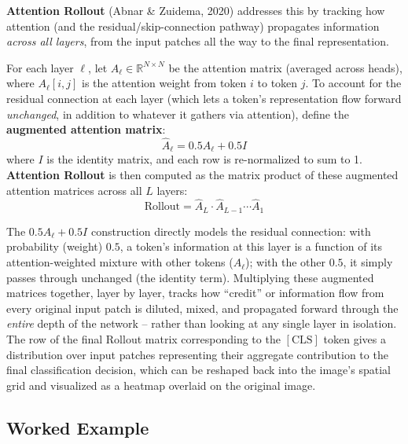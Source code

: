 \documentclass[12pt,a4paper]{article}
\begin{document}
\textbf{Attention Rollout} (Abnar \& Zuidema, 2020) addresses this by tracking how attention (and the residual/skip-connection pathway) propagates information \emph{across all layers}, from the input patches all the way to the final representation.

\begin{defbox}
For each layer $\ell$, let $A_\ell \in \mathbb{R}^{N\times N}$ be the attention matrix (averaged across heads), where $A_\ell[i,j]$ is the attention weight from token $i$ to token $j$. To account for the residual connection at each layer (which lets a token's representation flow forward \emph{unchanged}, in addition to whatever it gathers via attention), define the \textbf{augmented attention matrix}:
\[
\hat{A}_\ell = 0.5 A_\ell + 0.5 I
\]
where $I$ is the identity matrix, and each row is re-normalized to sum to 1. \textbf{Attention Rollout} is then computed as the matrix product of these augmented attention matrices across all $L$ layers:
\[
\text{Rollout} = \hat{A}_L \cdot \hat{A}_{L-1} \cdots \hat{A}_1
\]
\end{defbox}

\begin{keyidea}
The $0.5A_\ell + 0.5I$ construction directly models the residual connection: with probability (weight) $0.5$, a token's information at this layer is a function of its attention-weighted mixture with other tokens ($A_\ell$); with the other $0.5$, it simply passes through unchanged (the identity term). Multiplying these augmented matrices together, layer by layer, tracks how ``credit'' or information flow from every original input patch is diluted, mixed, and propagated forward through the \emph{entire} depth of the network -- rather than looking at any single layer in isolation. The row of the final Rollout matrix corresponding to the $[\text{CLS}]$ token gives a distribution over input patches representing their aggregate contribution to the final classification decision, which can be reshaped back into the image's spatial grid and visualized as a heatmap overlaid on the original image.
\end{keyidea}

\subsection{Worked Example}
\end{document}
